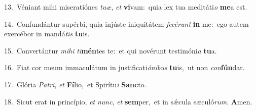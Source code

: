 {\numbfont\textcolor{\numbcolor}{13.}}~Véniant mihi miseratiónes \textit{tu}\-\textit{æ}, \textit{et} \textbf{vi}\-vam:~\star quia lex tua meditáti\textit{o} \textbf{me}\-a est.\par
{\numbfont\textcolor{\numbcolor}{14.}}~Confundántur supérbi, quia injúste iniquitátem \textit{fe}\-\textit{cé}\textit{runt} \textbf{in} me:~\star ego autem exercébor in mandá\textit{tis} \textbf{tu}\-is.\par
{\numbfont\textcolor{\numbcolor}{15.}}~Convertántur \textit{mi}\-\textit{hi} \textit{ti}\-\textbf{mén}tes te:~\star et qui novérunt testimóni\textit{a} \textbf{tu}\-a.\par
{\numbfont\textcolor{\numbcolor}{16.}}~Fiat cor meum immaculátum in justificati\-\textit{ó}\-\textit{ni}\textit{bus} \textbf{tu}\-is,~\star ut non \textit{con}\-\textbf{fún}dar.\par
{\numbfont\textcolor{\numbcolor}{17.}}~Glória \textit{Pa}\-\textit{tri}, \textit{et} \textbf{Fí}\-lio,~\star et Spirítu\textit{i} \textbf{Sanc}\-to.\par
{\numbfont\textcolor{\numbcolor}{18.}}~Sicut erat in princípio, \textit{et} \textit{nunc}\-, \textit{et} \textbf{sem}\-per,~\star et in sǽcula sæculó\-\textit{rum}\-. \textbf{A}\-men.\par
